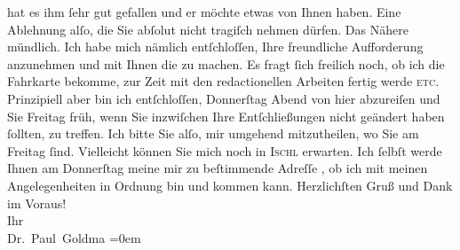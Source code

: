 \begin{ledgroupsized}[t]{13cm}
               hat es ihm ſehr gut gefallen und er möchte etwas \label{K_L02642-1v}\label{K_L02642-1h} von Ihnen haben. Eine Ablehnung alſo, die Sie abſolut {\pb}nicht tragiſch nehmen dürfen. Das
               Nähere mündlich.\pend
           \pstart
           Ich habe mich nämlich entſchloſſen, Ihre freundliche Aufforderung anzunehmen und mit
               Ihnen die \label{K_L02642-2v}\label{K_L02642-2h} zu machen. Es fragt ſich freilich noch,
               ob ich die Fahrkarte bekomme, zur Zeit mit den redactionellen Arbeiten fertig werde
                  \textsc{etc}. Prinzipiell aber bin ich entſchloſſen, Donnerſtag{ }Abend von hier
               abzureiſen und Sie Freitag{ }früh, wenn Sie inzwiſchen Ihre Entſchließungen nicht geändert haben
               ſollten, \label{K_L02642-4v}\label{K_L02642-4h} zu treffen. Ich bitte Sie
               alſo, mir umgehend mitzutheilen, wo Sie am Freitag
               ſind. {\pb}Vielleicht können Sie mich
               noch in \textsc{Ischl} erwarten. Ich ſelbſt werde Ihnen am Donnerſtag
               meine mir zu beſtimmende Adreſſe \label{K_L02642-3v}\label{K_L02642-3h}, ob ich mit meinen Angelegenheiten in Ordnung bin und kommen
               kann.\pend
           \pstart
           Herzlichſten Gruß und Dank im Voraus! {\\[\baselineskip]}Ihr {\\[\baselineskip]}\spacefill\mbox{Dr. Paul Goldma{\geminationn}}\pend
           \leftskip=0em{}\endnumbering{}\end{ledgroupsized}  \newcommand{\dateiname}{L02642}\newcommand{\titel}{Paul Goldmann an Arthur Schnitzler, 4. 8. 1889}\newcommand{\editorInnen}{Martin Anton Müller und Laura Untner}
      